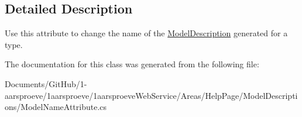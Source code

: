 \subsection{Detailed Description}
Use this attribute to change the name of the \hyperlink{class__1aarsproeve_web_service_1_1_areas_1_1_help_page_1_1_model_descriptions_1_1_model_description}{Model\+Description} generated for a type. 



The documentation for this class was generated from the following file\+:\begin{DoxyCompactItemize}
\item 
Documents/\+Git\+Hub/1-\/aarsproeve/1aarsproeve/1aarsproeve\+Web\+Service/\+Areas/\+Help\+Page/\+Model\+Descriptions/Model\+Name\+Attribute.\+cs\end{DoxyCompactItemize}
